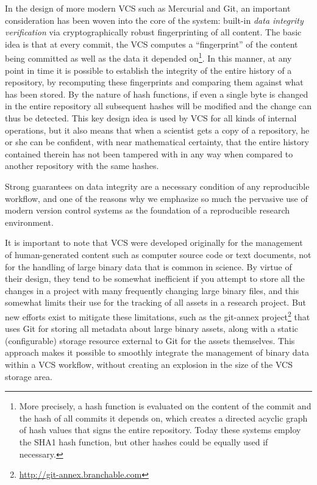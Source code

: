 \documentclass[ChapterTOCs,krantz2]{krantz} %
\begin{document}
In the design of more modern VCS such as Mercurial and Git, an important
consideration has been woven into the core of the system: built-in \emph{data
  integrity verification} via cryptographically robust fingerprinting of all
content.  The basic idea is that at every commit, the VCS computes a
``fingerprint'' of the content being committed as well as the data it depended
on\footnote{More precisely, a hash function is evaluated on the content of the
  commit and the hash of all commits it depends on, which creates a directed
  acyclic graph of hash values that signs the entire repository.  Today these
  systems employ the SHA1 hash function, but other hashes could be equally used
  if necessary.}.  In this manner, at any point in time it is possible to
establish the integrity of the entire history of a repository, by recomputing
these fingerprints and comparing them against what has been stored.  By the
nature of hash functions, if even a single byte is changed in the entire
repository all subsequent hashes will be modified and the change can thus be
detected.  This key design idea is used by VCS for all kinds of internal
operations, but it also means that when a scientist gets a copy of a
repository, he or she can be confident, with near mathematical certainty, that
the entire history contained therein has not been tampered with in any way when
compared to another repository with the same hashes.  

Strong guarantees on data integrity are a necessary condition of any
reproducible workflow, and one of the reasons why we emphasize so much the
pervasive use of modern version control systems as the foundation of a
reproducible research environment.

It is important to note that VCS were developed originally for the
management of human-generated content such as computer source code or text
documents, not for the handling of large binary data that is common in science.
By virtue of their design, they tend to be somewhat inefficient if you attempt
to store all the changes in a project with many frequently changing large
binary files, and this somewhat limits their use for the tracking of all assets
in a research project.  But new efforts exist to mitigate these limitations,
such as the git-annex project\footnote{\url{http://git-annex.branchable.com}}
that uses Git for storing all metadata about large binary assets, along
with a static (configurable) storage resource external to Git for the assets
themselves.  This approach makes it possible to smoothly integrate the
management of binary data within a VCS workflow, without creating an explosion
in the size of the VCS storage area.
\end{document}
